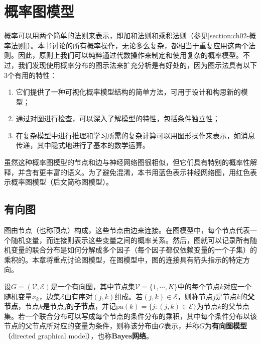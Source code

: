 \documentclass[../../main.tex]{subfiles}
\begin{document}
\section{概率图模型}\label{section:ch11-概率图模型}

概率可以用两个简单的法则来表示，即加和法则和乘积法则（参见\cref{section:ch02-概率法则}）。本书讨论的所有概率操作，无论多么复杂，都相当于重复应用这两个法则。因此，原则上我们可以纯粹通过代数操作来制定和使用复杂的概率模型。不过，我们发现使用概率分布的图示法来扩充分析是有好处的，因为图示法具有以下3个有用的特性：

\begin{enumerate}[(1)]
  \item 它们提供了一种可视化概率模型结构的简单方法，可用于设计和构思新的模型；
  \item 通过对图进行检查，可以深入了解模型的特性，包括条件独立性；
  \item 在复杂模型中进行推理和学习所需的复杂计算可以用图形操作来表示，如消息传递，其中隐式地进行了基本的数学运算。
\end{enumerate}

虽然这种概率图模型的节点和边与神经网络图很相似，但它们具有特别的概率性解释，并含有更丰富的语义。为了避免混淆，本书用蓝色表示神经网络图，用红色表示概率图模型（后文简称图模型）。

\subsection{有向图}\label{subsection:ch11-有向图}

图由节点（也称顶点）构成，这些节点由边来连接。在图模型中，每个节点代表一个随机变量，而连接则表示这些变量之间的概率关系。然后，图就可以记录所有随机变量的联合分布是如何分解成多个因子（每个因子都仅依赖变量的一个子集）的乘积的。本章将重点讨论图模型，在图模型中，图的连接具有箭头指示的特定方向。

\begin{definition}[有向图模型]\label{definition:ch11-有向图模型}
设$G=(\mathcal{V},\mathcal{E})$是一个有向图，其中节点集$\mathcal{V}=\{1,\cdots,K\}$中的每个节点$k$对应一个随机变量$x_k$，边集$\mathcal{E}$由有序对$(j,k)$组成。若$(j,k)\in\mathcal{E}$，则称节点$j$是节点$k$的\textbf{父节点}，节点$k$是节点$j$的\textbf{子节点}，并记$\mathrm{pa}(k)=\{j:(j,k)\in\mathcal{E}\}$为节点$k$的父节点集。若一个联合分布可以写成每个节点的条件分布的乘积，其中每个条件分布以该节点的父节点所对应的变量为条件，则称该分布由$G$表示，并称$G$为\textbf{有向图模型}（directed graphical model），也称\textbf{Bayes网络}。
\end{definition}
\end{document}
